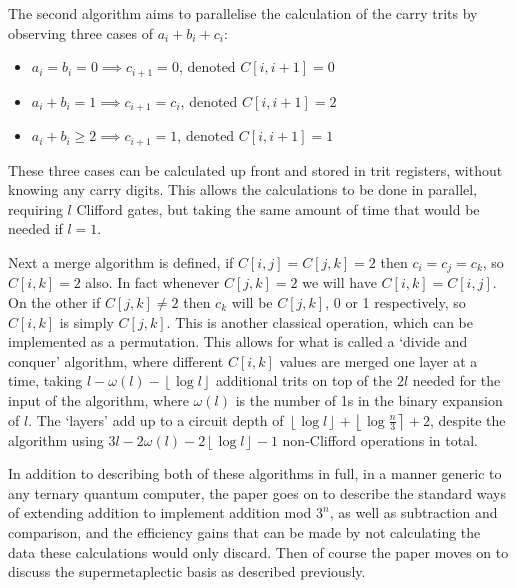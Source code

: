 The second algorithm aims to parallelise the calculation of the carry trits by observing three cases of $a_i + b_i + c_i$:
\begin{itemize}
	\item $a_i = b_i = 0 \implies c_{i+1} = 0$, denoted $C[i, i+1] = 0$
	\item $a_i + b_i = 1 \implies c_{i+1} = c_i$, denoted $C[i, i+1] = 2$
	\item $a_i + b_i \geq 2 \implies c_{i+1} = 1$, denoted $C[i, i+1] = 1$
\end{itemize}
These three cases can be calculated up front and stored in trit registers, without knowing any carry digits. This allows the calculations to be done in parallel, requiring $l$ Clifford gates, but taking the same amount of time that would be needed if $l = 1$.

Next a merge algorithm is defined, if $C[i, j] = C[j, k] = 2$ then $c_i = c_j = c_k$, so $C[i, k] = 2$ also. In fact whenever $C[j, k] = 2$ we will have $C[i, k] = C[i, j]$. On the other if $C[j, k] \neq 2$ then $c_k$ will be $C[j, k]$, 0 or 1 respectively, so $C[i, k]$ is simply $C[j, k]$. This is another classical operation, which can be implemented as a permutation. This allows for what is called a `divide and conquer' algorithm, where different $C[i, k]$ values are merged one layer at a time, taking $l - \omega(l) - \left\lfloor \log l \right\rfloor$ additional trits on top of the $2l$ needed for the input of the algorithm, where $\omega(l)$ is the number of 1s in the binary expansion of $l$. The `layers' add up to a circuit depth of $\left\lfloor \log l \right\rfloor + \left\lfloor \log \frac{n}{3} \right\rceil + 2$, despite the algorithm using $3l - 2\omega(l) - 2\left\lfloor \log l \right\rfloor - 1$ non-Clifford operations in total.

In addition to describing both of these algorithms in full, in a manner generic to any ternary quantum computer, the paper goes on to describe the standard ways of extending addition to implement addition mod $3^n$, as well as subtraction and comparison, and the efficiency gains that can be made by not calculating the data these calculations would only discard. Then of course the paper moves on to discuss the supermetaplectic basis as described previously.

